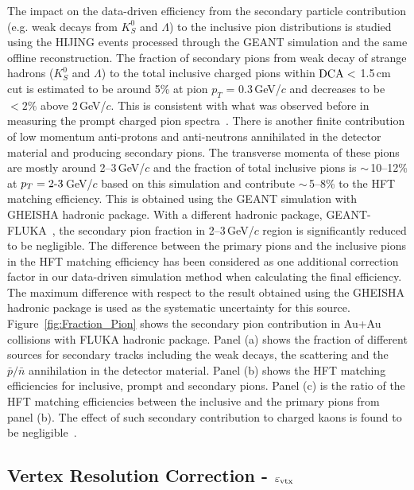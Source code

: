 \documentclass[%
 reprint,	
showpacs,
 amsmath,amssymb,
 aps,
 prc,
]{revtex4-1}
\providecommand{\DIFaddtex}[1]{{\protect\color{blue}\uwave{#1}}} %
\providecommand{\DIFdeltex}[1]{{\protect\color{red}\sout{#1}}}                      %
\providecommand{\DIFaddbegin}{} %
\providecommand{\DIFaddend}{} %
\providecommand{\DIFdelbegin}{} %
\providecommand{\DIFdelend}{} %
\providecommand{\DIFadd}[1]{\texorpdfstring{\DIFaddtex{#1}}{#1}} %
\providecommand{\DIFdel}[1]{\texorpdfstring{\DIFdeltex{#1}}{}} %
\begin{document}
The impact on the data-driven efficiency from the secondary particle contribution (e.g. weak decays from $K^0_S$ and $\Lambda$) to the inclusive pion distributions is studied using the HIJING events processed through the GEANT simulation and the same offline reconstruction. The fraction of secondary pions from weak decay of strange hadrons ($K^0_S$ and $\Lambda$) to the total inclusive charged pions within ${\rm DCA}<$ 1.5\,cm cut is estimated to be around 5\% at pion $p_{T}$ = 0.3\,GeV/$c$ and decreases to be $<2\%$ above 2\,GeV/$c$. This is consistent with what was observed before in measuring the prompt charged pion spectra~\cite{Adams:2003xp}. There is another finite contribution of low momentum anti-protons and anti-neutrons annihilated in the detector material and producing secondary pions. The transverse momenta of these pions are mostly around 2--3\,GeV/$c$ and the fraction of total inclusive pions is \DIFdelbegin \DIFdel{$\sim$}\DIFdelend \DIFaddbegin \DIFadd{$\approx$}\DIFaddend \,10--12\% at $p_{T} =2\textup{-}3$\,GeV/$c$ based on this simulation and contribute \DIFdelbegin \DIFdel{$\sim$}\DIFdelend \DIFaddbegin \DIFadd{$\approx$}\DIFaddend \,5--8\% to the HFT matching efficiency. This is obtained using the GEANT simulation with GHEISHA hadronic package. With a different hadronic package, GEANT-FLUKA~\cite{GEANTFLUKA}, the secondary pion fraction in 2--3\,GeV/$c$ region is significantly reduced to be negligible. The difference between the primary pions and the inclusive pions in the HFT matching efficiency has been considered as one additional correction factor in our data-driven simulation method when calculating the final efficiency. The maximum difference with respect to the result obtained using the GHEISHA hadronic package is used as the systematic uncertainty for this source. Figure~\ref{fig:Fraction_Pion} shows the secondary pion contribution in Au+Au collisions with FLUKA hadronic package. Panel (a) shows the fraction of different sources for secondary tracks including the weak decays, the scattering and the $\bar{p}/\bar{n}$ annihilation in the detector material. Panel (b) shows the HFT matching efficiencies for inclusive, prompt and secondary pions. Panel (c) is the ratio of the HFT matching efficiencies between the inclusive and the primary pions from panel (b). The effect of such secondary contribution to charged kaons is found to be negligible~\cite{Adams:2003xp}.

\subsection{Vertex Resolution Correction - $\varepsilon_{\rm vtx}$}
\label{correction:vtx}
\end{document}
